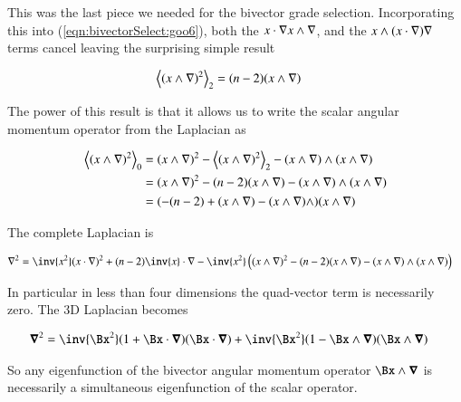 This was the last piece we needed for the bivector grade selection.  Incorporating this into (\ref{eqn:bivectorSelect:goo6}), both the $x \cdot \nabla x \wedge \nabla$, and the $x \wedge (x \cdot \nabla) \nabla$ terms cancel leaving the surprising simple result

\begin{align}\label{eqn:bivectorSelect:goo11}
{\left\langle{{ (x \wedge \nabla)^2 }}\right\rangle}_{2}
&=
(n-2) (x \wedge \nabla) 
\end{align}

The power of this result is that it allows us to write the scalar angular momentum operator from the Laplacian as

\begin{align*}
{\left\langle{{ (x \wedge \nabla)^2 }}\right\rangle}_{0} 
&= (x \wedge \nabla)^2 - {\left\langle{{ (x \wedge \nabla)^2 }}\right\rangle}_{2} - (x \wedge \nabla) \wedge (x \wedge \nabla) \\
&= (x \wedge \nabla)^2 - (n-2) (x \wedge \nabla) - (x \wedge \nabla) \wedge (x \wedge \nabla) \\
&= (-(n-2) + (x \wedge \nabla) - (x \wedge \nabla) \wedge ) (x \wedge \nabla) 
\end{align*}

The complete Laplacian is

\begin{align}\label{eqn:bivectorSelect:goo12}
\grad^2 &= \inv{x^2} (x \cdot \grad)^2 + (n - 2) \inv{x} \cdot \grad 
- \inv{x^2} 
\left(
(x \wedge \grad)^2 - (n-2) (x \wedge \grad) - (x \wedge \grad) \wedge (x \wedge \grad) 
\right)
\end{align}

In particular in less than four dimensions the quad-vector term is necessarily zero.  The 3D Laplacian becomes

\begin{align}\label{eqn:bivectorSelect:goo13}
\spacegrad^2 &= \inv{\Bx^2} (1 + \Bx \cdot \spacegrad)(\Bx \cdot \spacegrad)
+ \inv{\Bx^2} (1 - \Bx \wedge \spacegrad) (\Bx \wedge \spacegrad) 
\end{align}

So any eigenfunction of the bivector angular momentum operator $\Bx \wedge \spacegrad$ is necessarily a simultaneous eigenfunction of the scalar operator.

\EndNoBibArticle

